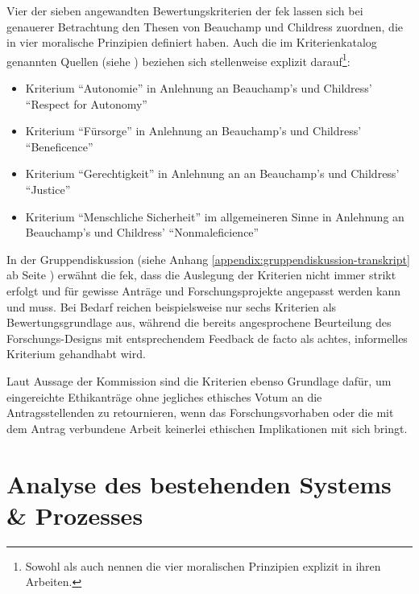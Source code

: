 \documentclass[a4paper,12pt,twoside]{scrreprt}
\begin{document}
\medskip

Vier der sieben angewandten Bewertungskriterien der \ac{fek} lassen sich bei genauerer Betrachtung den Thesen von Beauchamp und Childress zuordnen, die in \cite{beauchamp_principles_1994} vier moralische Prinzipien definiert haben. Auch die im Kriterienkatalog genannten Quellen (siehe \cite[2]{forschungsethik-kommission_der_fachhochschule_vorarlberg_kriterienkatalog_2021}) beziehen sich stellenweise explizit darauf\footnote{Sowohl \cite{marckmann_was_2000} als auch \cite{schuchter_care_2018} nennen die vier moralischen Prinzipien explizit in ihren Arbeiten.}:
\begin{itemize}
    \item Kriterium \enquote{Autonomie} in Anlehnung an Beauchamp's und Childress' \enquote{Respect for Autonomy} \cite[101-149]{beauchamp_principles_1994}
    \item Kriterium \enquote{Fürsorge} in Anlehnung an Beauchamp's und Childress' \enquote{Beneficence} \cite[202-248]{beauchamp_principles_1994}
    \item Kriterium \enquote{Gerechtigkeit} in Anlehnung an an Beauchamp's und Childress' \enquote{Justice} \cite[249-301]{beauchamp_principles_1994}
    \item Kriterium \enquote{Menschliche Sicherheit} im allgemeineren Sinne in Anlehnung an Beauchamp's und Childress' \enquote{Nonmaleficience} \cite[150-201]{beauchamp_principles_1994}
\end{itemize}

In der Gruppendiskussion (siehe Anhang \ref{appendix:gruppendiskussion-transkript} ab Seite \pageref{appendix:gruppendiskussion-transkript}) erwähnt die \acl{fek}, dass die Auslegung der Kriterien nicht immer strikt erfolgt und für gewisse Anträge und Forschungsprojekte angepasst werden kann und muss. Bei Bedarf reichen beispielsweise nur sechs Kriterien als Bewertungsgrundlage aus, während die bereits angesprochene Beurteilung des Forschungs-Designs mit entsprechendem Feedback de facto als achtes, informelles Kriterium gehandhabt wird.

Laut Aussage der Kommission sind die Kriterien ebenso Grundlage dafür, um eingereichte Ethikanträge ohne jegliches ethisches Votum an die Antragsstellenden zu retournieren, wenn das Forschungsvorhaben oder die mit dem Antrag verbundene Arbeit keinerlei ethischen Implikationen mit sich bringt.

\chapter{Analyse des bestehenden Systems \& Prozesses}
\label{chap:analyse-bestehendes-system-prozess}
\end{document}
